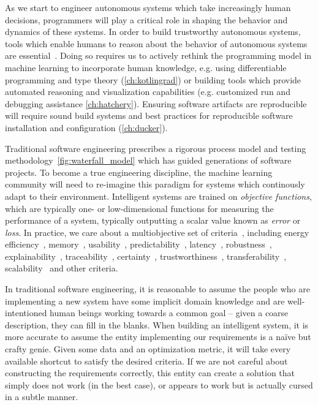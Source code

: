 As we start to engineer autonomous systems which take increasingly human decisions, programmers will play a critical role in shaping the behavior and dynamics of these systems. In order to build trustworthy autonomous systems, tools which enable humans to reason about the behavior of autonomous systems are essential~\citep{famelis2012partial}. Doing so requires us to actively rethink the programming model in machine learning to incorporate human knowledge, e.g. using differentiable programming and type theory (\autoref{ch:kotlingrad}) or building tools which provide automated reasoning and visualization capabilities (e.g. customized run and debugging assistance \autoref{ch:hatchery}). Ensuring software artifacts are reproducible will require sound build systems and best practices for reproducible software installation and configuration (\autoref{ch:ducker}).

Traditional software engineering prescribes a rigorous process model and testing methodology~\autoref{fig:waterfall_model} which has guided generations of software projects. To become a true engineering discipline, the machine learning community will need to re-imagine this paradigm for systems which continously adapt to their environment. Intelligent systems are trained on \textit{objective functions}, which are typically one- or low-dimensional functions for measuring the performance of a system, typically outputting a scalar value known as \textit{error} or \textit{loss}. In practice, we care about a multiobjective set of criteria~\citep{censi2015mathematical}, including energy efficiency~\citep{paull2010novel}, memory~\citep{memory2013mitliagkas}, usability~\citep{breuleux2017automatic}, predictability~\citep{turner2017well}, latency~\citep{ravanelli2018twin}, robustness~\citep{pineau2003policy}, explainability~\citep{turner2016model}, traceability~\citep{guo2017semantically, tsirigotis2018orion}, certainty~\citep{diaz2018interactive}, trustworthiness~\citep{xu2017efficient}, transferability~\citep{mehta2019active}, scalability~\citep{luan2019break} and other criteria.

In traditional software engineering, it is reasonable to assume the people who are implementing a new system have some implicit domain knowledge and are well-intentioned human beings working towards a common goal -- given a coarse description, they can fill in the blanks. When building an intelligent system, it is more accurate to assume the entity implementing our requirements is a na\"ive but crafty genie. Given some data and an optimization metric, it will take every available shortcut to satisfy the desired criteria. If we are not careful about constructing the requirements correctly, this entity can create a solution that simply does not work (in the best case), or appears to work but is actually cursed in a subtle manner.

